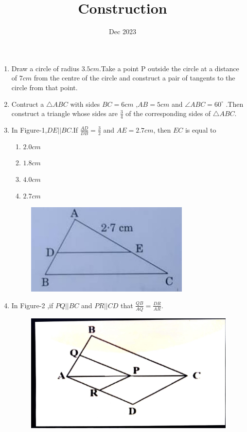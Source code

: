 \documentclass[12pt,-letter paper]{article}
\title{Construction}
\date{Dec 2023}
\begin{document}
\maketitle
\begin{enumerate}
\item Draw a circle of radius $3.5cm$.Take a point P outside the circle at a distance of $7cm$ from the centre of the circle and construct a pair of tangents to the circle from that point.

\item Contruct a $\bigtriangleup ABC $ with sides $BC = 6cm$ ,$AB = 5cm$ and $\angle ABC = 60^{\circ}$ .Then construct a triangle whose sides are $\frac{3}{4}$ of the corresponding sides of $\bigtriangleup ABC$.

\item In Figure-1,$DE || BC $.If $\frac{AD}{DB}=\frac{3}{2}$ and $AE = 2.7cm$, then $EC$ is equal to
\begin{enumerate}
		\item $2.0cm$ 
                \item $1.8cm$ 
                \item $4.0cm$
                \item $2.7cm$
\end{enumerate}
	\begin{figure}[H]
		\centering
		\includegraphics[width=0.5\columnwidth]{figs/Construction-1.jpg}
		\caption{}
	\end{figure}

\item In Figure-2 ,if $PQ || BC$ and $PR || CD$ that $\frac{QB}{AQ} = \frac{DR}{AR}$.
	\begin{figure}[H]
		\centering
		\includegraphics[width=0.5\columnwidth]{figs/Construction-2.jpg}
		\caption{}
	\end{figure}

\end{enumerate}
\end{document}
